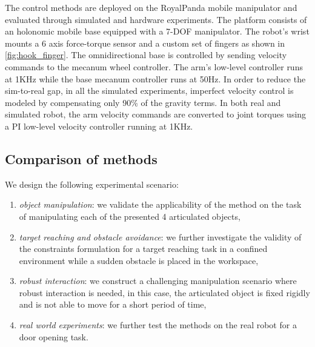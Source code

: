 The control methods are deployed on the RoyalPanda mobile manipulator and evaluated through simulated and hardware experiments. The platform consists of an holonomic mobile base equipped with a 7-DOF manipulator. The robot's wrist mounts a 6 axis force-torque sensor and a custom set of fingers as shown in \fig\ref{fig:hook_finger}.  The omnidirectional base is controlled by sending velocity commands to the mecanum wheel controller. The arm's low-level controller runs at 1KHz while the base mecanum controller runs at 50Hz. In order to reduce the sim-to-real gap, in all the simulated experiments, imperfect velocity control is modeled by compensating only 90\% of the gravity terms. In both real and simulated robot, the arm velocity commands are converted to joint torques using a PI low-level velocity controller running at 1KHz. 




\subsection{Comparison of methods}
We design the following experimental scenario:
\begin{enumerate}
    \item \textit{object manipulation}: we validate the applicability of the method on the task of manipulating each of the presented 4 articulated objects,   
    \item \textit{target reaching and obstacle avoidance}: we further investigate the validity of the constraints formulation for a target reaching task in a confined environment while a sudden obstacle is placed in the workspace,
    \item \textit{robust interaction}: we construct a challenging manipulation scenario where robust interaction is needed, in this case, the articulated object is fixed rigidly and is not able to move for a short period of time,
    \item \textit{real world experiments}: we further test the methods on the real robot for a door opening task. 
\end{enumerate}

